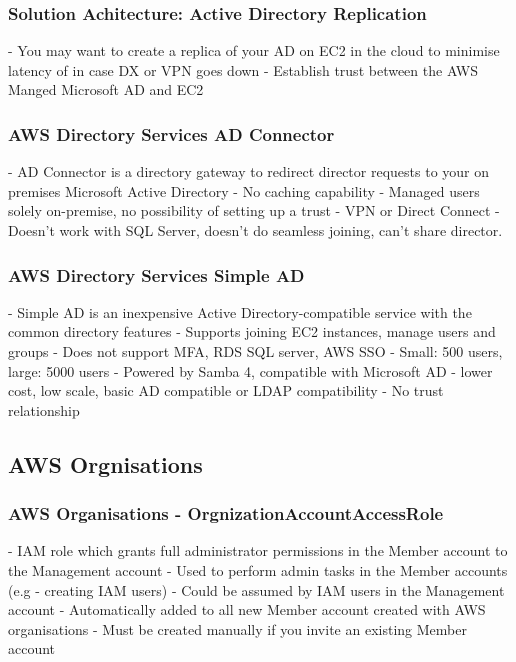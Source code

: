 \documentclass[11pt]{book}
\begin{document}
    \subsubsection{Solution Achitecture: Active Directory Replication}
    - You may want to create a replica of your AD on EC2 in the cloud to minimise latency of in case DX or VPN goes down
    - Establish trust between the AWS Manged Microsoft AD and EC2

    \subsubsection{AWS Directory Services AD Connector}
    - AD Connector is a directory gateway to redirect director requests to your on premises Microsoft Active Directory
    - No caching capability
    - Managed users solely on-premise, no possibility of setting up a trust
    - VPN or Direct Connect
    - Doesn't work with SQL Server, doesn't do seamless joining, can't share director.

    \subsubsection{AWS Directory Services Simple AD}
    - Simple AD is an inexpensive Active Directory-compatible service with the common directory features
    - Supports joining EC2 instances, manage users and groups
    - Does not support MFA, RDS SQL server, AWS SSO
    - Small: 500 users, large: 5000 users
    - Powered by Samba 4, compatible with Microsoft AD
    - lower cost, low scale, basic AD compatible or LDAP compatibility
    - No trust relationship

    \subsection{AWS Orgnisations}

    \subsubsection{AWS Organisations - OrgnizationAccountAccessRole}
    - IAM role which grants full administrator permissions in the Member account to the Management account
    - Used to perform admin tasks in the Member accounts (e.g - creating IAM users)
    - Could be assumed by IAM users in the Management account
    - Automatically added to all new Member account created with AWS organisations
    - Must be created manually if you invite an existing Member account
\end{document}
